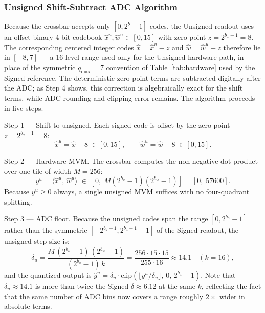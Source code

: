 \documentclass[a4paper,11pt,oneside]{article}
\theoremstyle{breakstyle}
\begin{document}
  \subsubsection{Unsigned Shift-Subtract ADC Algorithm}
  \label{sec:unipolar_algo}

  Because the crossbar accepts only $[0, 2^b-1]$ codes, the Unsigned
  readout uses an offset-binary 4-bit codebook
  $\hat{x}^u, \hat{w}^u \in [0, 15]$ with zero point
  $z = 2^{b_x - 1} = 8$.  The corresponding centered integer codes
  $\hat{x} = \hat{x}^u - z$ and $\hat{w} = \hat{w}^u - z$ therefore
  lie in $[-8, 7]$ --- a 16-level range used only for the Unsigned
  hardware path, in place of the symmetric $q_{\mathrm{max}} = 7$
  convention of Table~\ref{tab:hardware} used by the Signed
  reference.  The deterministic zero-point terms are subtracted
  digitally after the ADC; as Step 4 shows, this correction is
  algebraically exact for the shift terms, while ADC rounding and
  clipping error remains.
  The algorithm proceeds in five steps.

  Step 1 — Shift to unsigned.
  Each signed code is offset by the zero-point $z = 2^{b_x - 1} = 8$:
  \[
    \hat{x}^u = \hat{x} + 8 \;\in [0, 15], \qquad
    \hat{w}^u = \hat{w} + 8 \;\in [0, 15].
  \]

  Step 2 — Hardware MVM.
  The crossbar computes the non-negative dot product over one tile of
  width $M = 256$:
  \[
    y^u = \langle \hat{x}^u,\, \hat{w}^u \rangle \;\in\; [0,\; M(2^{b_x}-1)(2^{b_w}-1)]
        = [0,\; 57600].
  \]
  Because $y^u \ge 0$ always, a single unsigned MVM suffices with no
  four-quadrant splitting.

  Step 3 — ADC floor.
  Because the unsigned codes span the range $[0, 2^{b_a}-1]$ rather
  than the symmetric $[-2^{b_a-1}, 2^{b_a-1}-1]$ of the Signed
  readout, the unsigned step size is:
  \[
    \delta_u = \frac{M\,(2^{b_x}-1)\,(2^{b_w}-1)}{(2^{b_a}-1)\,k}
             = \frac{256 \cdot 15 \cdot 15}{255 \cdot 16} \approx 14.1
    \quad (k = 16),
  \]
  and the quantized output is
  $\hat{y}^u = \delta_u \cdot \mathrm{clip}\!\left(\lfloor y^u / \delta_u \rfloor,\,0,\,2^{b_a}-1\right)$.
  Note that $\delta_u \approx 14.1$ is more than twice the Signed
  $\delta \approx 6.12$ at the same $k$, reflecting the fact that the
  same number of ADC bins now covers a range roughly $2\times$ wider
  in absolute terms.
\end{document}
